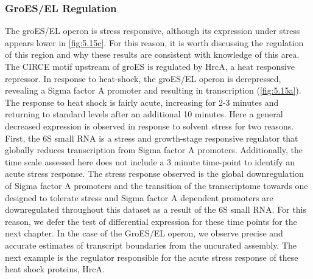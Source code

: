 \subsubsection{GroES/EL Regulation}
The groES/EL operon is stress responsive, although its expression under stress appears lower in \ref{fig:5.15c}. For this reason, it is worth discussing the regulation of this region and why these results are consistent with knowledge of this area. The CIRCE motif upstream of groES is regulated by HrcA, a heat responsive repressor\cite{42,77,78}. In response to heat-shock, the groES/EL operon is derepressed, revealing a Sigma factor A promoter and resulting in transcription (\ref{fig:5.15a}). The response to heat shock is fairly acute, increasing for 2-3 minutes and returning to standard levels after an additional 10 minutes\cite{77}. Here a general decreased expression is observed in response to solvent stress for two reasons. First, the 6S small RNA is a stress and growth-stage responsive regulator that globally reduces transcription from Sigma factor A promoters\cite{39,79}. Additionally, the time scale assessed here does not include a 3 minute time-point to identify an acute stress response. The stress response observed is the global downregulation of Sigma factor A promoters and the transition of the transcriptome towards one designed to tolerate stress and Sigma factor A dependent promoters are downregulated throughout this dataset as a result of the 6S small RNA. For this reason, we defer the test of differential expression for these time points for the next chapter. In the case of the GroES/EL operon, we observe precise and accurate estimates of transcript boundaries from the uncurated assembly. The next example is the regulator responsible for the acute stress response of these heat shock proteins, HrcA.



